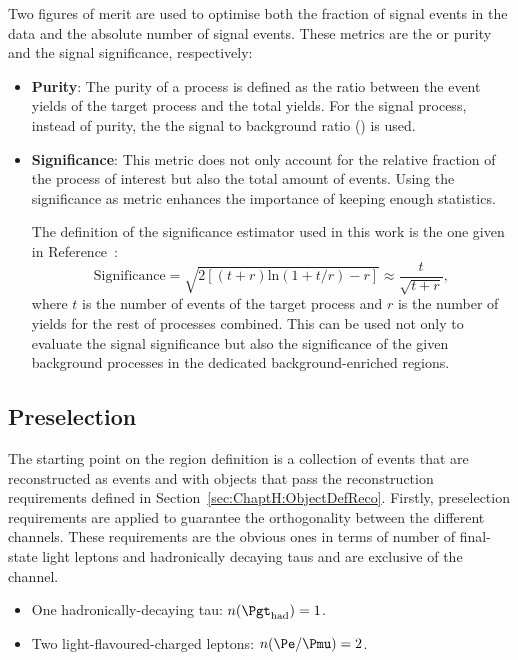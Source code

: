 Two figures of merit are used to optimise both the fraction of signal events in the data and the
absolute number of signal events. These metrics are the \StoB or purity and the signal significance,
respectively:
\begin{itemize}
\item \textbf{Purity}: 	The purity of a process is defined as the ratio between the 
				event yields of the target process and the total yields. For the signal process, 
				instead of purity, the the signal to background ratio (\StoB) is used.
				
\item \textbf{Significance}:	This metric does not only account for the relative fraction of the
					process of interest but also the total amount of events. Using
					the significance as metric enhances the importance of keeping 
					enough statistics. 
					
					The definition of the significance estimator used in this work is
					the one given in Reference~\cite{Cowan:2010js}: %
					\begin{equation*}
						\text{Significance} = \sqrt{2 [(t+r) \text{ln}(1+t/r) - r]} \approx \frac{t}{\sqrt{t+r}},
					\end{equation*}
					where $t$ is the number of events of the target process 
					and $r$ is the number of yields for the rest of processes 
					combined. This can be used not only to evaluate the signal 
					significance but also the significance of the given background processes
					in the dedicated background-enriched regions.
\end{itemize}
			
\subsection{Preselection}
\label{sec:ChaptH:EventSelection:PR}
The starting point on the region definition is a collection of events 
that are reconstructed as \tHq events and with objects that
pass the reconstruction requirements defined in Section~\ref{sec:ChaptH:ObjectDefReco}.
Firstly, preselection requirements are applied to guarantee the orthogonality between the 
different \tHq channels. These requirements are the obvious ones in terms of number 
of final-state light leptons and hadronically decaying taus and are exclusive of the \dileptau channel.
\begin{itemize}
	\item One hadronically-decaying tau: $n(\tauhad)=1$.
	\item Two light-flavoured-charged leptons:  $n(\Pe / \Pmu)=2$.
\end{itemize}

